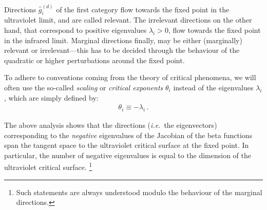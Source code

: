\documentclass[11pt]{book}
\newcommand\ie{\textit{i.e.}\ }
\numberwithin{equation}{chapter}
\begin{document}
\bigskip
\noindent
{}
\bigskip

Directions $\hat g_i^{\scriptscriptstyle{(d)}}$ of the first
category flow towards the fixed point in the ultraviolet
limit, and are called relevant.
The irrelevant directions on the other hand,
that correspond to positive eigenvalues $\lambda_i > 0$,
flow towards the fixed point in the infrared limit.
Marginal directions finally, may be either (marginally)
relevant or irrelevant---this has to be decided
through the behaviour of the quadratic or higher
perturbations around the fixed point.

To adhere to conventions coming from the theory of critical
phenomena, we will often use the so-called \textit{scaling}
or \textit{critical exponents} $\theta_i$ instead of the
eigenvalues $\lambda_i$, which are simply defined by:
\begin{align}
  \theta_i \equiv - \lambda_i \,.
\end{align}

The above analysis shows that the directions (\ie the
eigenvectors) corresponding to the \textit{negative}
eigenvalues of the Jacobian of the beta functions
span the tangent space to the
ultraviolet critical surface at the fixed point.
In particular, the number of negative eigenvalues
is equal to the dimension of the ultraviolet critical
surface.%
\footnote{
  Such statements are always understood modulo the behaviour
  of the marginal directions.
}
\end{document}
